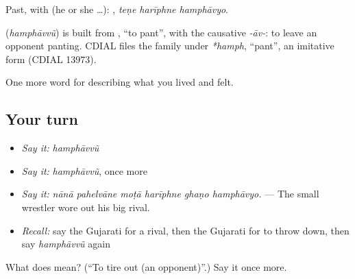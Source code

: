 Past, with  (he or she …):   , \emph{teṇe harīphne hamphāvyo}.

\begin{cousinweb}
\textbf{} (\emph{hamphāvvũ}) is built from \textbf{}, \textquotedblleft{}to pant\textquotedblright{}, with the causative \emph{-āv-}: to leave an opponent panting. CDIAL files the family under \emph{*hamph}, \textquotedblleft{}pant\textquotedblright{}, an imitative form (CDIAL 13973).
\end{cousinweb}

\begin{grammarlens}[title={What you've built}]
One more word for describing what you lived and felt.
\end{grammarlens}

\subsection*{Your turn}
\begin{itemize}
\raggedright
  \item \emph{Say it:} \emph{hamphāvvũ}
  \item \emph{Say it:} \emph{hamphāvvũ}, once more
  \item \emph{Say it:} \emph{nānā pahelvāne moṭā harīphne ghaṇo hamphāvyo.} — The small wrestler wore out his big rival.
  \item \emph{Recall:} say the Gujarati for a rival, then the Gujarati for to throw down, then say \emph{hamphāvvũ} again
\end{itemize}

\begin{tcolorbox}[breakable,colback=teal!4,colframe=teal!35!black,title={Before you move on}]
What does  mean? (\textquotedblleft{}To tire out (an opponent)\textquotedblright{}.) Say it once more.
\end{tcolorbox}

